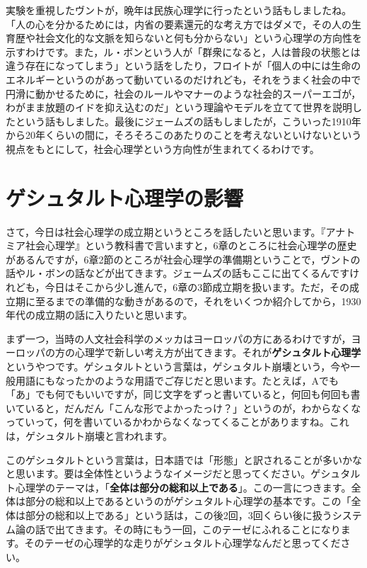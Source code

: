 \documentclass{ltjsbook}
\begin{document}
実験を重視したヴントが，晩年は民族心理学に行ったという話もしましたね。「人の心を分かるためには，内省の要素還元的な考え方ではダメで，その人の生育歴や社会文化的な文脈を知らないと何も分からない」という心理学の方向性を示すわけです。また，ル・ボンという人が「群衆になると，人は普段の状態とは違う存在になってしまう」という話をしたり，フロイトが「個人の中には生命のエネルギーというのがあって動いているのだけれども，それをうまく社会の中で円滑に動かせるために，社会のルールやマナーのような社会的スーパーエゴが，わがまま放題のイドを抑え込むのだ」という理論やモデルを立てて世界を説明したという話もしました。最後にジェームズの話もしましたが，こういった1910年から20年くらいの間に，そろそろこのあたりのことを考えないといけないという視点をもとにして，社会心理学という方向性が生まれてくるわけです。

\section{ゲシュタルト心理学の影響}
さて，今日は社会心理学の成立期というところを話したいと思います。『アナトミア社会心理学』という教科書で言いますと，6章のところに社会心理学の歴史があるんですが，6章2節のところが社会心理学の準備期ということで，ヴントの話やル・ボンの話などが出てきます。ジェームズの話もここに出てくるんですけれども，今日はそこから少し進んで，6章の3節成立期を扱います。ただ，その成立期に至るまでの準備的な動きがあるので，それをいくつか紹介してから，1930年代の成立期の話に入りたいと思います。

まず一つ，当時の人文社会科学のメッカはヨーロッパの方にあるわけですが，ヨーロッパの方の心理学で新しい考え方が出てきます。それが\textbf{ゲシュタルト心理学}というやつです。ゲシュタルトという言葉は，ゲシュタルト崩壊という，今や一般用語にもなったかのような用語でご存じだと思います。たとえば，Aでも「あ」でも何でもいいですが，同じ文字をずっと書いていると，何回も何回も書いていると，だんだん「こんな形でよかったっけ？」というのが，わからなくなっていって，何を書いているかわからなくなってくることがありますね。これは，ゲシュタルト崩壊と言われます。

このゲシュタルトという言葉は，日本語では「形態」と訳されることが多いかなと思います。要は全体性というようなイメージだと思ってください。ゲシュタルト心理学のテーマは，「\textbf{全体は部分の総和以上である}」。この一言につきます。全体は部分の総和以上であるというのがゲシュタルト心理学の基本です。この「全体は部分の総和以上である」という話は，この後2回，3回くらい後に扱うシステム論の話で出てきます。その時にもう一回，このテーゼにふれることになります。そのテーゼの心理学的な走りがゲシュタルト心理学なんだと思ってください。
\end{document}
